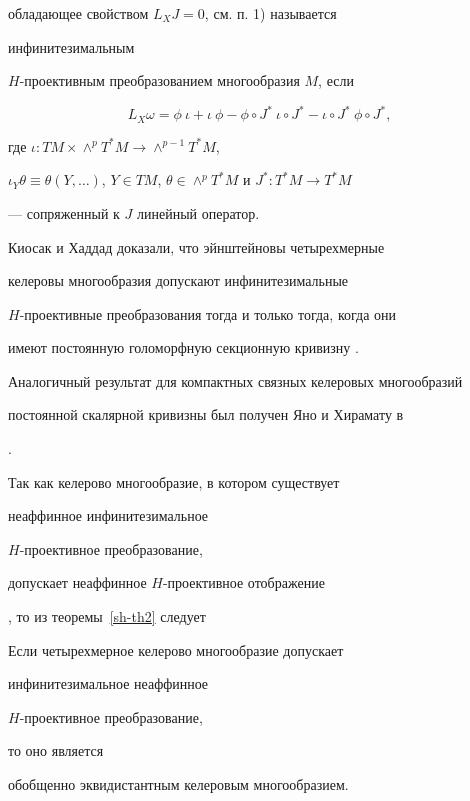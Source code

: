 обладающее свойством $L_X J=0$, см. п. 1) называется


инфинитезимальным


$H$-проективным преобразованием многообразия $M$, если


$$


L_X \omega =\phi\:\iota+\iota\:\phi-


\phi\circ J^* \:\iota\circ J^*-\iota\circ J^* \: \phi\circ J^*,


$$


где $\iota:TM \times\land^p T^*M \to \land^{p-1}T^*M$,


$\iota_Y \theta\equiv \theta (Y,\dotsc )$, $Y\in TM$, $\theta \in


\land^p T^*M$ и $J^*: T^*M \to T^*M$


--- сопряженный к $J$ линейный оператор.





Киосак и Хаддад \cite{kiha} доказали, что эйнштейновы четырехмерные


келеровы многообразия допускают инфинитезимальные


$H$-проективные преобразования тогда и только тогда, когда они


имеют постоянную голоморфную секционную кривизну \cite{kobn}.


Аналогичный результат для компактных связных келеровых многообразий


постоянной скалярной кривизны был получен Яно и Хирамату в


\cite{yahi1}.





Так как келерово многообразие, в котором существует


неаффинное инфинитезимальное


$H$-проективное преобразование,


допускает неаффинное $H$-проективное отображение


\cite{sin1}, то из теоремы~\ref{sh-th2} следует





\begin{thm}\label{sh-th3}


Если четырехмерное келерово многообразие допускает


инфинитезимальное неаффинное


$H$-проективное преобразование,


то оно является


обобщенно эквидистантным келеровым многообразием.


\end{thm}








